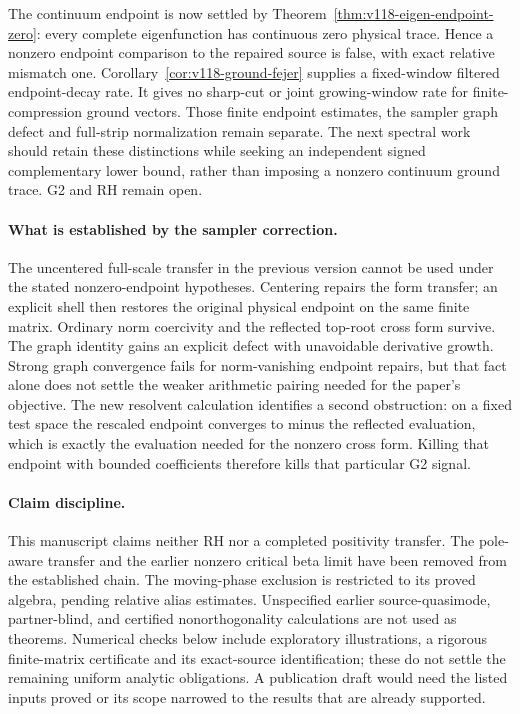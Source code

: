 \documentclass[11pt]{article}
\theoremstyle{remark}
\begin{document}
The continuum endpoint is now settled by
Theorem~\ref{thm:v118-eigen-endpoint-zero}: every complete eigenfunction
has continuous zero physical trace. Hence a nonzero endpoint comparison
to the repaired source is false, with exact relative mismatch one.
Corollary~\ref{cor:v118-ground-fejer} supplies a fixed-window filtered
endpoint-decay rate. It gives no sharp-cut or joint growing-window rate
for finite-compression ground vectors. Those finite endpoint estimates,
the sampler graph defect and full-strip normalization remain separate.
The next spectral work should retain these distinctions while seeking
an independent signed complementary lower bound, rather than imposing
a nonzero continuum ground trace. G2 and RH remain open.


\paragraph{What is established by the sampler correction.}
The uncentered full-scale transfer in the previous version cannot be used
under the stated nonzero-endpoint hypotheses. Centering repairs the form
transfer; an explicit shell then restores the original physical endpoint
on the same finite matrix. Ordinary norm coercivity and the reflected
top-root cross form survive. The graph identity gains an explicit defect
with unavoidable derivative growth. Strong graph convergence fails for
norm-vanishing endpoint repairs, but that fact alone does not settle the
weaker arithmetic pairing needed for the paper's objective. The new
resolvent calculation identifies a second obstruction: on a fixed test
space the rescaled endpoint converges to minus the reflected evaluation,
which is exactly the evaluation needed for the nonzero cross form.
Killing that endpoint with bounded coefficients therefore kills that
particular G2 signal.

\paragraph{Claim discipline.}
This manuscript claims neither RH nor a completed positivity transfer.
The pole-aware transfer and the earlier nonzero critical beta limit have
been removed from the established chain. The moving-phase exclusion is
restricted to its proved algebra, pending relative alias estimates.
Unspecified earlier source-quasimode, partner-blind, and certified
nonorthogonality calculations are not used as theorems. Numerical checks
below include exploratory illustrations, a rigorous finite-matrix
certificate and its exact-source identification; these do not settle
the remaining uniform analytic obligations. A publication draft would need the listed inputs
proved or its scope narrowed to the results that are already supported.
\end{document}
